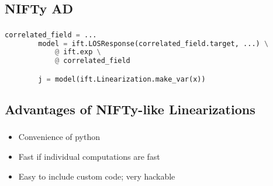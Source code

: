 \documentclass[aspectratio=169,xcolor=dvipsnames]{beamer}
\begin{document}



\subsection{NIFTy AD}
\begin{frame}[fragile]
	\frametitle{\insertsection}
	\framesubtitle{\insertsubsection}

	\begin{lstlisting}[language=python,escapechar=!]
		correlated_field = ...
		model = ift.LOSResponse(correlated_field.target, ...) \
			@ ift.exp \
			@ correlated_field

		j = model(ift.Linearization.make_var(x))
	\end{lstlisting}

\end{frame}

\subsection{Advantages of NIFTy-like Linearizations}
\begin{frame}
	\frametitle{\insertsection}
	\framesubtitle{\insertsubsection}

	\begin{itemize}
		\item Convenience of python
		\item Fast if individual computations are fast
		\item Easy to include custom code; very hackable
	\end{itemize}

\end{frame}
\end{document}
